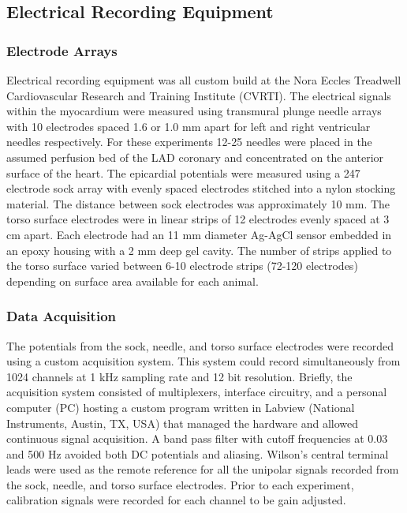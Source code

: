 \documentclass[twocolumn]{cinc}
\begin{document}
\subsection{Electrical Recording Equipment}

\subsubsection{Electrode Arrays}

Electrical recording equipment was all custom build at the Nora Eccles Treadwell Cardiovascular Research and Training Institute (CVRTI). The electrical signals within the myocardium were measured using transmural plunge needle arrays with 10 electrodes spaced 1.6 or 1.0 mm apart for left and right ventricular needles respectively. For these experiments 12-25 needles were placed in the assumed perfusion bed of the LAD coronary and concentrated on the anterior surface of the heart. The epicardial potentials were measured using a 247 electrode sock array with evenly spaced electrodes stitched into a nylon stocking material. The distance between sock electrodes was approximately 10 mm. The torso surface electrodes were in linear strips of 12 electrodes evenly spaced at 3 cm apart. Each electrode had an 11 mm diameter Ag-AgCl sensor embedded in an epoxy housing with a 2 mm deep gel cavity. The number of strips applied to the torso surface varied between 6-10 electrode strips (72-120 electrodes) depending on surface area available for each animal. 

\subsubsection{Data Acquisition}

The potentials from the sock, needle, and torso surface electrodes were recorded using a custom acquisition system. This system could record simultaneously from 1024 channels at 1 kHz sampling rate and 12 bit resolution. Briefly, the acquisition system consisted of multiplexers, interface circuitry, and a personal computer (PC) hosting a custom program written in Labview (National Instruments, Austin, TX, USA) that managed the hardware and allowed continuous signal acquisition. A band pass filter with cutoff frequencies at 0.03 and 500 Hz avoided both DC potentials and aliasing. Wilson's central terminal leads were used as the remote reference for all the unipolar signals recorded from the sock, needle, and torso surface electrodes. Prior to each experiment, calibration signals were recorded for each channel to be gain adjusted.  
\end{document}
